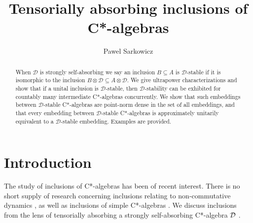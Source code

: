 \documentclass[12pt]{amsart}
\begin{document}
\title{Tensorially absorbing inclusions of C*-algebras}
\author{Pawel Sarkowicz}
\address{Department of Mathematics and Statistics, University of Ottawa, 75 Laurier Ave. East, Ottawa, ON, K1N 6N5 Canada}

  \begin{abstract}
    When $\mathcal{D}$ is strongly self-absorbing we say an inclusion $B \subseteq A$ is $\mathcal{D}$-stable if it is isomorphic to the inclusion $B \otimes \mathcal{D} \subseteq A \otimes \mathcal{D}$. We give ultrapower characterizations and show that if a unital inclusion is $\mathcal{D}$-stable, then $\mathcal{D}$-stability can be exhibited for countably many intermediate C*-algebras concurrently. We show that such embeddings between $\mathcal{D}$-stable C*-algebras are point-norm dense in the set of all embeddings, and that every embedding between $\mathcal{D}$-stable C*-algebras is approximately unitarily equivalent to a $\mathcal{D}$-stable embedding. Examples are provided. 
  \end{abstract}

  \maketitle
  \tableofcontents
  
  
\section{Introduction}
  The study of inclusions of C*-algebras has been of recent interest. There is no short supply of research concerning inclusions relating to non-commutative dynamics \cite{Popa00,Izumi02,CameronSmith19,OsakaTeruya18,EchterhoffRordam21}, as well as inclusions of simple C*-algebras \cite{Rordam21}. We discuss inclusions from the lens of tensorially absorbing a strongly self-absorbing C*-algebra $\mathcal{D}$ \cite{TomsWinter07}.
\end{document}
